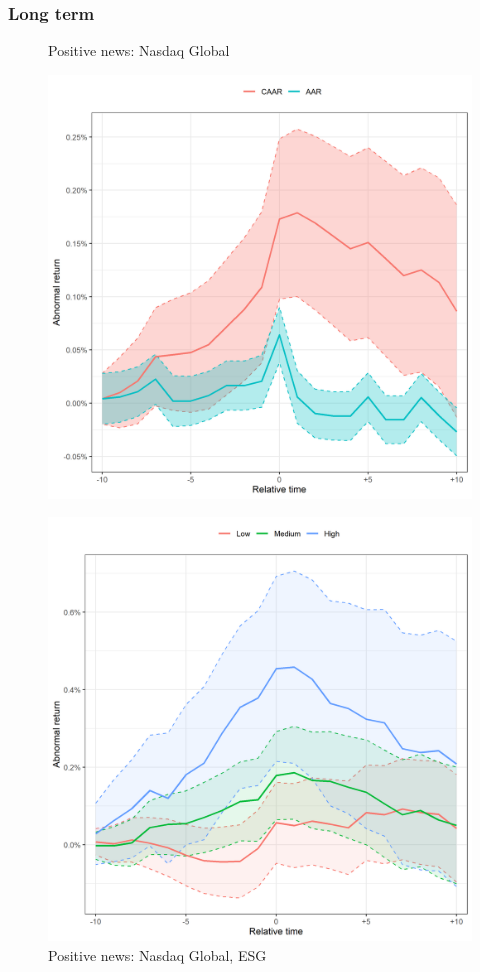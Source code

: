 \subsubsection{Long term}

\begin{figure} [H]
     \centering
     \begin{minipage}[b]{0.49\textwidth}
         \centering
    \caption{Positive news: Nasdaq Global}
    \includegraphics[width=\textwidth]{Projekt/1.Figures analysis/ST_positive_all_CI_nasdaq.png}
     \label{fig:ST_pos_sensitivity_nasdaq}
     \end{minipage}
     \hfill
     \begin{minipage}[b]{0.49\textwidth}
       \centering
    \caption{Positive news: Nasdaq Global, ESG}
    \includegraphics[width=\textwidth]{Projekt/1.Figures analysis/ST_positive_ESG_nasdaq.png}

\end{minipage}
\end{figure}
